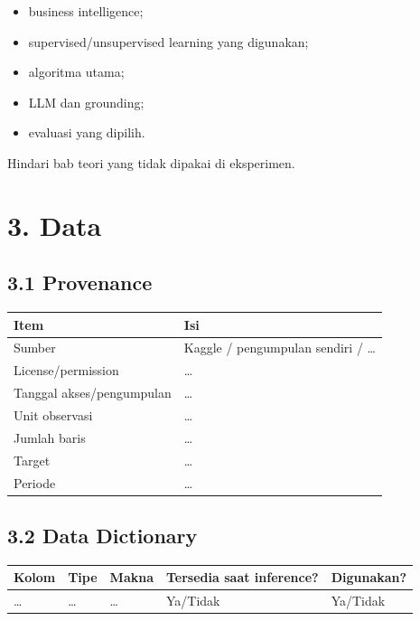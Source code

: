 \documentclass[
  indonesian,
  letterpaper,
  DIV=11,
  numbers=noendperiod]{scrreprt}
\newcounter{none} %
\providecommand{\tightlist}{%
  \setlength{\itemsep}{0pt}\setlength{\parskip}{0pt}}
\begin{document}
\begin{itemize}
\tightlist
\item
  business intelligence;
\item
  supervised/unsupervised learning yang digunakan;
\item
  algoritma utama;
\item
  LLM dan grounding;
\item
  evaluasi yang dipilih.
\end{itemize}

Hindari bab teori yang tidak dipakai di eksperimen.

\chapter{3. Data}\label{data}

\section{3.1 Provenance}\label{provenance}

{\def\LTcaptype{none} %
\begin{longtable}[]{@{}ll@{}}
\toprule\noalign{}
Item & Isi \\
\midrule\noalign{}
\endhead
\bottomrule\noalign{}
\endlastfoot
Sumber & Kaggle / pengumpulan sendiri / \ldots{} \\
License/permission & \ldots{} \\
Tanggal akses/pengumpulan & \ldots{} \\
Unit observasi & \ldots{} \\
Jumlah baris & \ldots{} \\
Target & \ldots{} \\
Periode & \ldots{} \\
\end{longtable}
}

\section{3.2 Data Dictionary}\label{data-dictionary}

{\def\LTcaptype{none} %
\begin{longtable}[]{@{}lllll@{}}
\toprule\noalign{}
Kolom & Tipe & Makna & Tersedia saat inference? & Digunakan? \\
\midrule\noalign{}
\endhead
\bottomrule\noalign{}
\endlastfoot
\ldots{} & \ldots{} & \ldots{} & Ya/Tidak & Ya/Tidak \\
\end{longtable}
}
\end{document}
